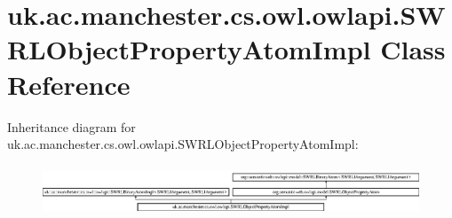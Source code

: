 \hypertarget{classuk_1_1ac_1_1manchester_1_1cs_1_1owl_1_1owlapi_1_1_s_w_r_l_object_property_atom_impl}{\section{uk.\-ac.\-manchester.\-cs.\-owl.\-owlapi.\-S\-W\-R\-L\-Object\-Property\-Atom\-Impl Class Reference}
\label{classuk_1_1ac_1_1manchester_1_1cs_1_1owl_1_1owlapi_1_1_s_w_r_l_object_property_atom_impl}
}
Inheritance diagram for uk.\-ac.\-manchester.\-cs.\-owl.\-owlapi.\-S\-W\-R\-L\-Object\-Property\-Atom\-Impl\-:\begin{figure}[H]
\begin{center}
\leavevmode
\includegraphics[height=1.521739cm]{classuk_1_1ac_1_1manchester_1_1cs_1_1owl_1_1owlapi_1_1_s_w_r_l_object_property_atom_impl}
\end{center}
\end{figure}
